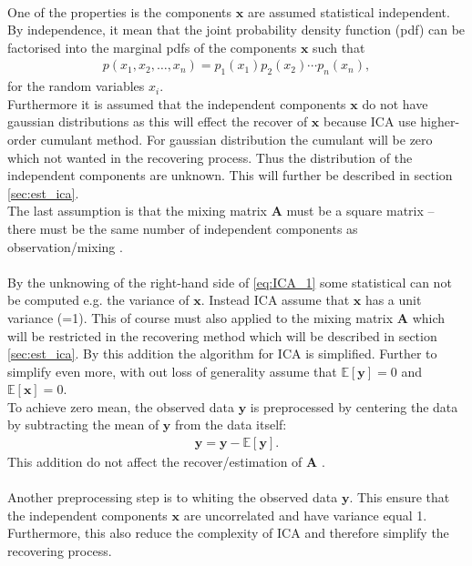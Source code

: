 \\
One of the properties is the components $\mathbf{x}$ are assumed statistical independent. By independence, it mean that the joint probability density function (pdf) can be factorised into the marginal pdfs of the components $\mathbf{x}$ such that
\begin{align*}
p(x_1, x_2, \dots, x_n) = p_1 (x_1) p_2(x_2) \cdots p_n(x_n),
\end{align*}
for the random variables $x_i$.
\\
Furthermore it is assumed that the independent components $\mathbf{x}$ do not have gaussian distributions as this will effect the recover of $\mathbf{x}$ because ICA use higher-order cumulant method. For gaussian distribution the cumulant will be zero which not wanted in the recovering process. Thus the distribution of the independent components are unknown. This will further be described in section \ref{sec:est_ica}.
\\
The last assumption is that the mixing matrix $\mathbf{A}$ must be a square matrix -- there must be the same number of independent components as observation/mixing \cite[p. 152-153]{ICA}.
\\ \\
By the unknowing of the right-hand side of \eqref{eq:ICA_1} some statistical can not be computed e.g. the variance of $\mathbf{x}$. Instead ICA assume that $\mathbf{x}$ has a unit variance (=1). This of course must also applied to the mixing matrix $\mathbf{A}$ which will be restricted in the recovering method which will be described in section \ref{sec:est_ica}. By this addition the algorithm for ICA is simplified. Further to simplify even more, with out loss of generality assume that $\mathbb{E}[\mathbf{y}] = 0$ and $\mathbb{E}[\mathbf{x}] = 0$. 
\\
To achieve zero mean, the observed data $\mathbf{y}$ is preprocessed by centering the data by subtracting the mean of $\mathbf{y}$ from the data itself:
\begin{align*}
\mathbf{y} = \mathbf{y} - \mathbb{E}[\mathbf{y}].
\end{align*}
This addition do not affect the recover/estimation of $\mathbf{A}$ \cite[p. 154]{ICA}.
\\ \\
Another preprocessing step is to whiting the observed data $\mathbf{y}$. This ensure that the independent components $\mathbf{x}$ are uncorrelated and have variance equal 1. Furthermore, this also reduce the complexity of ICA and therefore simplify the recovering process.
